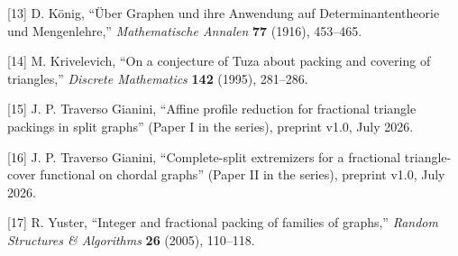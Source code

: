 \documentclass[
  11pt,
]{article}
\begin{document}
{[}13{]} D. König, ``Über Graphen und ihre Anwendung auf
Determinantentheorie und Mengenlehre,'' \emph{Mathematische Annalen}
\textbf{77} (1916), 453--465.

{[}14{]} M. Krivelevich, ``On a conjecture of Tuza about packing and
covering of triangles,'' \emph{Discrete Mathematics} \textbf{142}
(1995), 281--286.

{[}15{]} J. P. Traverso Gianini, ``Affine profile reduction for
fractional triangle packings in split graphs'' (Paper I in the series),
preprint v1.0, July 2026.

{[}16{]} J. P. Traverso Gianini, ``Complete-split extremizers for a
fractional triangle-cover functional on chordal graphs'' (Paper II in
the series), preprint v1.0, July 2026.

{[}17{]} R. Yuster, ``Integer and fractional packing of families of
graphs,'' \emph{Random Structures \& Algorithms} \textbf{26} (2005),
110--118.
\end{document}
